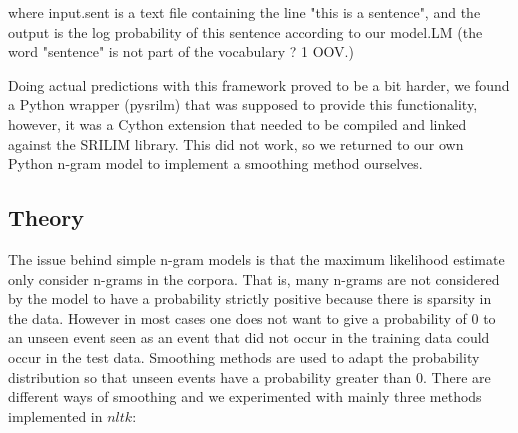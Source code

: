 \documentclass[a4paper,12pt]{article}
\begin{document}
where input.sent is a text file containing the line "this is a sentence", and the output is the log probability of this sentence according to our model.LM (the word "sentence" is not part of the vocabulary ? 1 OOV.)

Doing actual predictions with this framework proved to be a bit harder, we found a Python wrapper (pysrilm) that was supposed to provide this functionality, however, it was a Cython extension that needed to be compiled and linked against the SRILIM library. This did not work, so we returned to our own Python n-gram model to implement a smoothing method ourselves.

\label{sec:ngramsmoothing}

\subsection{Theory}
	The issue behind simple n-gram models is that the maximum likelihood estimate only consider n-grams in the corpora. That is, many n-grams are not considered by the model to have a probability strictly positive because there is sparsity in the data. However in most cases one does not want to give a probability of 0 to an unseen event seen as an event that did not occur in the training data could occur in the test data. Smoothing methods are used to adapt the probability distribution so that unseen events have a probability greater than 0. There are different ways of smoothing and we experimented with mainly three methods implemented in $nltk$:
	
\end{document}
